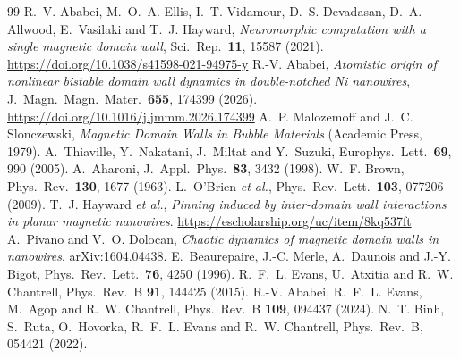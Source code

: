 \documentclass[11pt,a4paper]{report}
\begin{document}
\begin{thebibliography}{99}
 R.~V. Ababei, M.~O.~A. Ellis, I.~T. Vidamour, D.~S. Devadasan, D.~A. Allwood, E.~Vasilaki and T.~J. Hayward, \emph{Neuromorphic computation with a single magnetic domain wall}, Sci.\ Rep.\ \textbf{11}, 15587 (2021). \url{https://doi.org/10.1038/s41598-021-94975-y}
 R.-V. Ababei, \emph{Atomistic origin of nonlinear bistable domain wall dynamics in double-notched Ni nanowires}, J.\ Magn.\ Magn.\ Mater.\ \textbf{655}, 174399 (2026). \url{https://doi.org/10.1016/j.jmmm.2026.174399}
 A.~P. Malozemoff and J.~C. Slonczewski, \emph{Magnetic Domain Walls in Bubble Materials} (Academic Press, 1979).
 A.~Thiaville, Y.~Nakatani, J.~Miltat and Y.~Suzuki, Europhys.\ Lett.\ \textbf{69}, 990 (2005).
 A.~Aharoni, J.\ Appl.\ Phys.\ \textbf{83}, 3432 (1998).
 W.~F. Brown, Phys.\ Rev.\ \textbf{130}, 1677 (1963).
 L.~O'Brien \emph{et al.}, Phys.\ Rev.\ Lett.\ \textbf{103}, 077206 (2009).
 T.~J. Hayward \emph{et al.}, \emph{Pinning induced by inter-domain wall interactions in planar magnetic nanowires}. \url{https://escholarship.org/uc/item/8kq537ft}
 A.~Pivano and V.~O. Dolocan, \emph{Chaotic dynamics of magnetic domain walls in nanowires}, arXiv:1604.04438.
 E.~Beaurepaire, J.-C. Merle, A.~Daunois and J.-Y. Bigot, Phys.\ Rev.\ Lett.\ \textbf{76}, 4250 (1996).
 R.~F.~L. Evans, U.~Atxitia and R.~W. Chantrell, Phys.\ Rev.\ B \textbf{91}, 144425 (2015).
 R.-V. Ababei, R.~F.~L. Evans, M.~Agop and R.~W. Chantrell, Phys.\ Rev.\ B \textbf{109}, 094437 (2024).
 N.~T. Binh, S.~Ruta, O.~Hovorka, R.~F.~L. Evans and R.~W. Chantrell, Phys.\ Rev.\ B, 054421 (2022).
\end{thebibliography}
\end{document}
